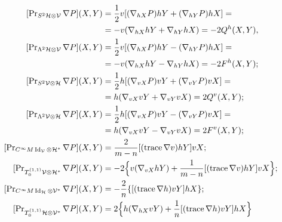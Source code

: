\begin{align*} 


[\pr_{S^2\cal H\otimes\cal V}\nabla P](X,Y)&=\frac{1}{2} 


v[(\nabla_{hX}P)hY+(\nabla_{hY}P)hX]=\\ 


&=-v(\nabla_{hX}hY+\nabla_{hY}hX)=-2Q^h(X,Y),\\ 


% 


[\pr_{\Lambda^2\cal H\otimes\cal V}\nabla P](X,Y)&=\frac{1}{2} 


v[(\nabla_{hX}P)hY-(\nabla_{hY}P)hX]=\\ 


&=-v(\nabla_{hX}hY-\nabla_{hY}hX)=-2F^h(X,Y);\\ 


% 


[\pr_{S^2\cal V\otimes\cal H}\nabla P](X,Y)&=\frac{1}{2} 


h[(\nabla_{vX}P)vY+(\nabla_{vY}P)vX]=\\ 


&=h(\nabla_{vX}vY+\nabla_{vY}vX)=2Q^v(X,Y); \\


% 


[\pr_{\Lambda^2\cal V\otimes\cal H}\nabla P](X,Y)&=\frac{1}{2} 


h[(\nabla_{vX}P)vY-(\nabla_{vY}P)vX]= \\ 


&=h(\nabla_{vX}vY-\nabla_{vY}vX)=2F^v(X,Y);\\ 


% 


[\pr_{C^\infty M\Id_{\cal V}\otimes\cal H^*}\nabla P](X,Y) 


&=\frac{2}{m-n}[(\trace\nabla v)hY]vX;\\ 


% 


[\pr_{T^{(1,1)}_0\cal V\otimes\cal H^*}\nabla P](X,Y)&= 


-2\Big\{v(\nabla_{vX}hY)+\frac{1}{m-n}[(\trace\nabla v) 


hY]vX\Big\}; \\ 


% 


[\pr_{C^\infty M\Id_{\cal H}\otimes\cal V^*}\nabla P](X,Y)&= 


-\frac{2}{n}\{[(\trace\nabla h)vY]hX\};\\ 


% 


[\pr_{T^{(1,1)}_0\cal H\otimes\cal V^*}\nabla P](X,Y)&= 


2\Big\{h(\nabla_{hX}vY)+\frac{1}{n}[(\trace\nabla h) 


vY]hX\Big\} 


\end{align*} 


